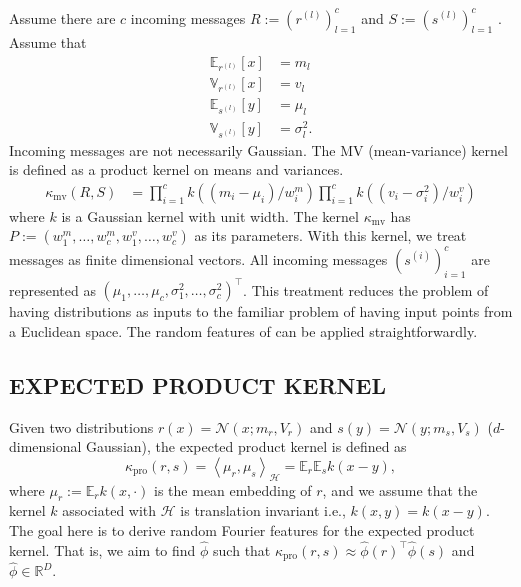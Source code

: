 \documentclass[english]{article}
\theoremstyle{plain}
\theoremstyle{plain}
\begin{document}
Assume there are $c$ incoming messages $R:=\left(r^{(l)}\right)_{l=1}^{c}$ 
and $S:=\left(s^{(l)}\right)_{l=1}^{c}$
. Assume that
\begin{align*}
\mathbb{E}_{r^{(l)}}\left[x\right] & =m_{l}\\
\mathbb{V}_{r^{(l)}}\left[x\right] & =v_{l}\\
\mathbb{E}_{s^{(l)}}\left[y\right] & =\mu_{l}\\
\mathbb{V}_{s^{(l)}}\left[y\right] & =\sigma_{l}^{2}.
\end{align*}
%
Incoming messages are not necessarily Gaussian. 
The MV (mean-variance) kernel is defined as a product
kernel on means and variances. 
\begin{align*}
\kappa_{\text{mv}}\left(R, S\right) 
 &=\prod_{i=1}^{c}k\left(\left(m_{i}-\mu_{i}\right)/w_{i}^{m}\right)\prod_{i=1}^{c}k\left(\left(v_{i}-\sigma_{i}^{2}\right)/w_{i}^{v}\right)
\end{align*}
where $k$ is a Gaussian kernel with unit width. The kernel $\kappa_{\text{mv}}$
has $P:=\left(w_{1}^{m},\ldots,w_{c}^{m},w_{1}^{v},\ldots,w_{c}^{v}\right)$
as its parameters. With this kernel, we treat messages as finite dimensional
vectors. All incoming messages $(s^{(i)})_{i=1}^{c}$ are 
represented as $\left(\mu_{1},\ldots,\mu_{c},\sigma_{1}^{2},\ldots,\sigma_{c}^{2}\right)^{\top}$.
This treatment reduces the problem of having distributions as inputs
to the familiar problem of having input points from a Euclidean space.
The random features of  can be applied straightforwardly. 

\subsection{EXPECTED PRODUCT KERNEL}
\label{sub:Expected-Product-Kernel}
Given two distributions $r(x)=\mathcal{N}(x;m_{r},V_{r})$ and $s(y)=\mathcal{N}(y;m_{s},V_{s})$
($d$-dimensional Gaussian), the expected product kernel is defined
as 
\[
\kappa_{\text{pro}}(r, s)=\left\langle \mu_{r},\mu_{s}\right\rangle _{\mathcal{H}}=\mathbb{E}_{r}\mathbb{E}_{s}k(x-y),
\]
where $\mu_{r}:=\mathbb{E}_{r}k(x,\cdot)$ is the mean embedding of
$r$, and we assume that the kernel $k$ associated with $\mathcal{H}$
is translation invariant i.e., $k(x,y)=k(x-y)$. The goal here is
to derive random Fourier features for the expected product kernel.
That is, we aim to find $\hat{\phi}$ such that $\kappa_{\text{pro}}(r, s)\approx\hat{\phi}(r)^{\top}\hat{\phi}(s)$
and $\hat{\phi}\in\mathbb{R}^{D}$. 
\end{document}

